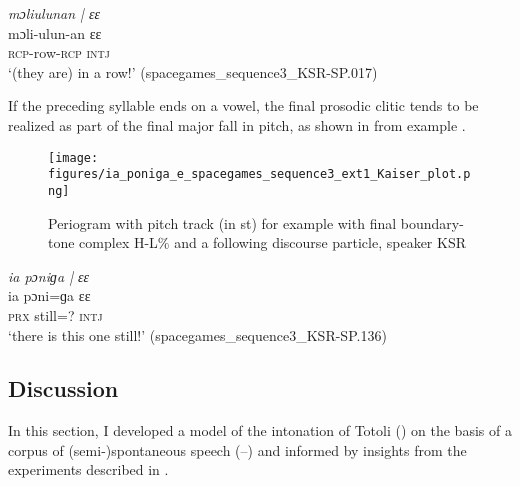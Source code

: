 \ea
\label{ex:moliulunan ee}
\textit{mɔliulunan | ɛɛ} \\
\gll  mɔli-ulun-an ɛɛ  \\
\textsc{rcp-}row\textsc{-rcp}  \textsc{intj}\\ 
\glt ‘(they are) in a row!’ \hfill(spacegames\_sequence3\_KSR-SP.017)
\z



If the preceding syllable ends on a vowel, the final prosodic clitic tends to be realized as part of the final major fall in pitch, as shown in   from example .


\begin{figure}
	\texttt{[image: figures/ia\_poniga\_e\_spacegames\_sequence3\_ext1\_Kaiser\_plot.png]}
	\caption{Periogram with pitch track (in st) for example  with final boundary-tone complex H-L\% and a following discourse particle, speaker KSR}
	\label{pitch:ia poniga ee}
\end{figure}





\ea 
\label{ex:ia poniga ee}
\textit{ia pɔniɡa | ɛɛ} \\
\gll ia pɔni=ɡa ɛɛ  \\
\textsc{prx} still=\textsc{?} \textsc{intj}\\ 
\glt ‘there is this one still!’ \hfill(spacegames\_sequence3\_KSR-SP.136)
\z



\subsection{Discussion}
\label{sec:discussion}





In this section, I developed a model of the intonation of Totoli () on the basis of a corpus of (semi-)spontaneous speech (--) and informed by insights from the  experiments described in .







